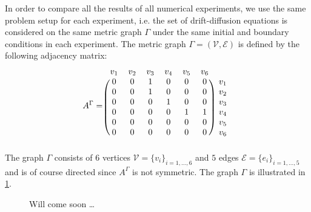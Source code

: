 In order to compare all the results of all numerical experiments, we use the same problem setup for each experiment, i.e. the set of drift-diffusion equations is considered on the same metric graph $\Gamma$ under the same initial and boundary conditions in each experiment. The metric graph $\Gamma = (\mathcal{V}, \mathcal{E})$ is defined by the following adjacency matrix: 
\begin{equation}
    \label{NumericalExperimentGraph}
    A^{\Gamma} = 
    \begin{blockarray}{ccccccc}
        v_1 & v_2 & v_3 & v_4 & v_5 & v_6 \\
        \begin{block}{(cccccc)c}
            0 & 0 & 1 & 0 & 0 & 0 & v_1 \\
            0 & 0 & 1 & 0 & 0 & 0 & v_2 \\
            0 & 0 & 0 & 1 & 0 & 0 & v_3 \\
            0 & 0 & 0 & 0 & 1 & 1 & v_4 \\
            0 & 0 & 0 & 0 & 0 & 0 & v_5 \\
            0 & 0 & 0 & 0 & 0 & 0 & v_6 \\
        \end{block}
    \end{blockarray}
\end{equation}
The graph $\Gamma$ consists of $6$ vertices $\mathcal{V} = \{ v_i \}_{i = 1,\ldots, 6}$ and $5$ edges $\mathcal{E} = \{ e_i \}_{i = 1,\ldots, 5}$ and is of course directed since $A^{\Gamma}$ is not symmetric. The graph $\Gamma$ is illustrated in \cref{fig7}. 
\begin{figure}[H]
    \begin{center}
    \end{center}
    \caption{Will come soon \ldots}
    \label{fig7}
\end{figure}
